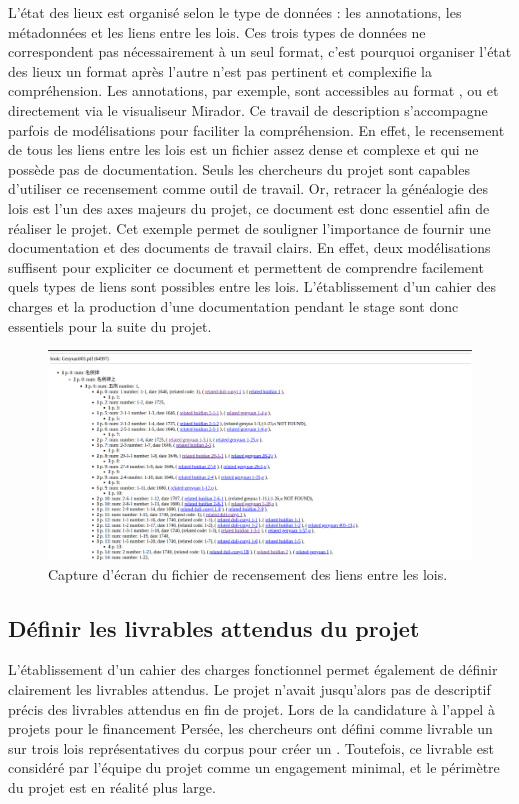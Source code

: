 L'état des lieux est organisé selon le type de données : les annotations, les métadonnées et les liens entre les lois. Ces trois types de données ne correspondent pas nécessairement à un seul format, c'est pourquoi organiser l'état des lieux un format après l'autre n'est pas pertinent et complexifie la compréhension. Les annotations, par exemple, sont accessibles au format \JSON, \csv ou \tsv et directement via le visualiseur Mirador. Ce travail de description s'accompagne parfois de modélisations \UML pour faciliter la compréhension. En effet, le recensement de tous les liens entre les lois est un fichier assez dense et complexe et qui ne possède pas de documentation. Seuls les chercheurs du projet \EPJ sont capables d'utiliser ce recensement comme outil de travail. Or, retracer la généalogie des lois est l'un des axes majeurs du projet, ce document est donc essentiel afin de réaliser le projet. Cet exemple permet de souligner l'importance de fournir une documentation et des documents de travail clairs. En effet, deux modélisations suffisent pour expliciter ce document et permettent de comprendre facilement quels types de liens sont possibles entre les lois. L'établissement d'un cahier des charges et la production d'une documentation pendant le stage sont donc essentiels pour la suite du projet.  

\begin{figure}
    \centering
    \includegraphics[width=\textwidth]{images/image6.png}
    \caption{Capture d'écran du fichier de recensement des liens entre les lois.}
\end{figure}

\subsection{Définir les livrables attendus du projet}

L'établissement d'un cahier des charges fonctionnel permet également de définir clairement les livrables attendus. Le projet \COREL n'avait jusqu'alors pas de descriptif précis des livrables attendus en fin de projet. Lors de la candidature à l'appel à projets pour le financement \CollEx Persée, les chercheurs ont défini comme livrable un \POC sur trois lois représentatives du corpus pour créer un \cv. Toutefois, ce livrable est considéré par l'équipe du projet comme un engagement minimal, et le périmètre du projet est en réalité plus large. 

